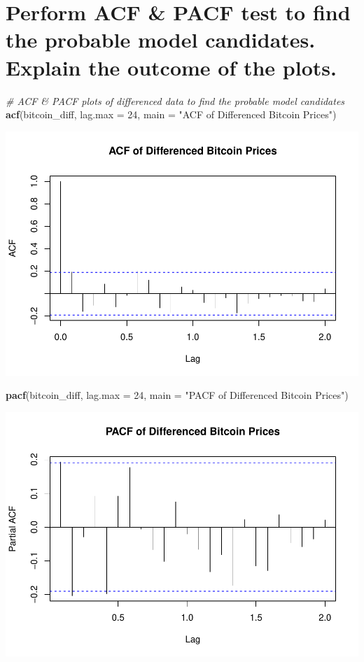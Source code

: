 \documentclass[
]{book}
\newenvironment{Shaded}{\begin{snugshade}}{\end{snugshade}}
\newcommand{\AttributeTok}[1]{\textcolor[rgb]{0.13,0.29,0.53}{#1}}
\newcommand{\CommentTok}[1]{\textcolor[rgb]{0.56,0.35,0.01}{\textit{#1}}}
\newcommand{\DecValTok}[1]{\textcolor[rgb]{0.00,0.00,0.81}{#1}}
\newcommand{\FunctionTok}[1]{\textcolor[rgb]{0.13,0.29,0.53}{\textbf{#1}}}
\newcommand{\NormalTok}[1]{#1}
\newcommand{\StringTok}[1]{\textcolor[rgb]{0.31,0.60,0.02}{#1}}
\begin{document}
\section{Perform ACF \& PACF test to find the probable model candidates. Explain the outcome of the plots.}\label{perform-acf-pacf-test-to-find-the-probable-model-candidates.-explain-the-outcome-of-the-plots.}

\begin{Shaded}
\begin{Highlighting}[]
\CommentTok{\# ACF \& PACF plots of differenced data to find the probable model candidates}
\FunctionTok{acf}\NormalTok{(bitcoin\_diff, }\AttributeTok{lag.max =} \DecValTok{24}\NormalTok{, }\AttributeTok{main =} \StringTok{"ACF of Differenced Bitcoin Prices"}\NormalTok{)}
\end{Highlighting}
\end{Shaded}

\includegraphics{bookdown-demo_files/figure-latex/unnamed-chunk-38-1.pdf}

\begin{Shaded}
\begin{Highlighting}[]
\FunctionTok{pacf}\NormalTok{(bitcoin\_diff, }\AttributeTok{lag.max =} \DecValTok{24}\NormalTok{, }\AttributeTok{main =} \StringTok{"PACF of Differenced Bitcoin Prices"}\NormalTok{)}
\end{Highlighting}
\end{Shaded}

\includegraphics{bookdown-demo_files/figure-latex/unnamed-chunk-38-2.pdf}
\end{document}
